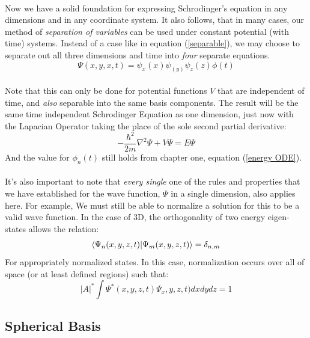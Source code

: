\documentclass[12pt,letterpaper]{book}
\begin{document}
\paragraph*{}Now we have a solid foundation for expressing Schrodinger's equation in any dimensions and in any coordinate system. It also follows, that in many cases, our method of \textit{separation of variables} can be used under constant potential (with time) systems. Instead of a case like in equation (\ref{separable}), we may choose to separate out all three dimensions and time into \textit{four} separate equations.
\begin{equation}
\Psi(x,y,x,t) = \psi_x(x) \psi_(y) \psi_z(z) \phi(t)
\end{equation}
\paragraph*{}Note that this can only be done for potential functions $V$ that are independent of time, and \textit{also} separable into the same basis components. The result will be the same time independent Schrodinger Equation as one dimension, just now with the Lapacian Operator taking the place of the sole second partial derivative:
\begin{equation}
\label{3D TSIE}
-\frac{\hbar^2}{2m}\nabla^2\Psi + V\Psi = E\Psi
\end{equation}
And the value for $\phi_n(t)$ still holds from chapter one, equation (\ref{energy ODE}).
\paragraph*{}It's also important to note that \textit{every single} one of the rules and properties that we have established for the wave function, $\Psi$ in a single dimension, also applies here. For example, We must still be able to normalize a solution for this to be a valid wave function. In the case of 3D, the orthogonality of two energy eigen-states allows the relation:
\begin{equation}
\braket{\Psi_n(x,y,z,t)}{\Psi_m(x,y,z,t)} = \delta_{n,m}
\end{equation}
For appropriately normalized states. In this case, normalization occurs over all of space (or at least defined regions) such that:
\begin{equation}
|A|^*\int \Psi^*(x,y,z,t)\Psi_x,y,z,t)dxdydz = 1
\end{equation}

\subsection*{Spherical Basis}
\end{document}
